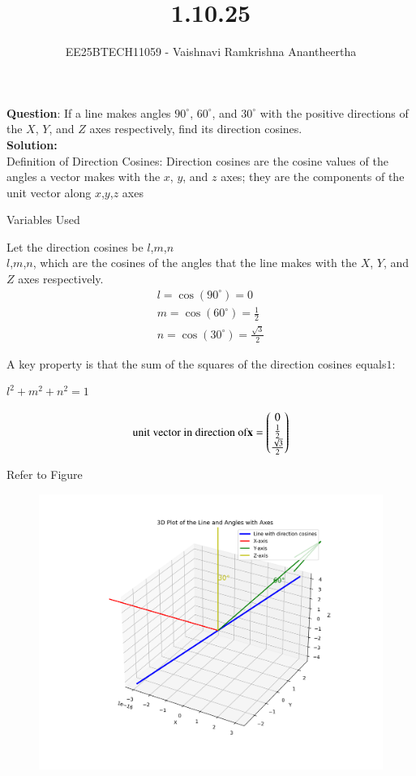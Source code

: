 \documentclass[journal]{IEEEtran}
\title{1.10.25}
\author{EE25BTECH11059 - Vaishnavi Ramkrishna Anantheertha}
\begin{document}
\maketitle

\renewcommand{\thefigure}{\theenumi}
\renewcommand{\thetable}{\theenumi}


\textbf{Question}:
If a line makes angles $90^\circ$, $60^\circ$, and $30^\circ$ with the positive directions of the $X$, $Y$, and $Z$ axes respectively, find its direction cosines.
\\
\textbf{Solution: }\\
Definition of Direction Cosines: Direction cosines are the cosine values of the angles a vector makes with the $x$, $y$, and $z$ axes; they are the components of the unit vector along $x$,$y$,$z$ axes \\
\begin{table}[H]    
  \centering
  
  \caption{Variables Used}
  \label{tab:1.10.25}
\end{table}
Let the direction cosines be 
$l$,$m$,$n$\\
$l$,$m$,$n$, which are the cosines of the angles that the line makes with the $X$, $Y$, and $Z$ axes respectively.\\
\begin{align}
       l = \cos(90^\circ) = 0  \\
       m = \cos(60^\circ) = \frac{1}{2}  \\
       n = \cos(30^\circ) = \frac{\sqrt{3}}{2}   
\end{align}

A key property is that the sum of the squares of the direction cosines equals$1$:
\begin{center}
    $ l^2 + m^2 + n^2 = 1 $
\end{center}    

\begin{align}
\text{unit vector in direction of} \mathbf{x}= \begin{pmatrix}
                                             0
                                              \\
                                               \frac{1}{2}
                                               \\
                                               \frac{\sqrt{3}}{2}
                                              \end{pmatrix}
\end{align}


Refer to Figure

\begin{figure}[H]
\begin{center}
\includegraphics[width=0.6\columnwidth]{figs/graph2.png}
\end{center}
\caption{}
\label{fig:Fig}
\end{figure}
\end{document}
